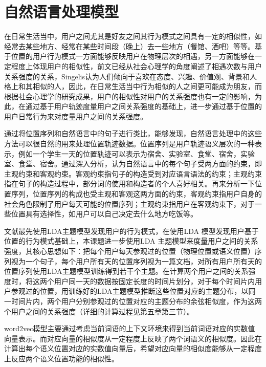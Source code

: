 \section{自然语言处理模型}
\label{sec:section2-3}
在日常生活当中，用户之间尤其是好友之间其行为模式之间具有一定的相似性，如经常去某些地方、经常在某些时间段（晚上）去一些地方（餐馆、酒吧）等等。基于位置的用户行为模式一方面能够反映用户在物理层次的相遇，另一方面能够在一定程度上体现用户的相似性，前文已经从社会心理学的角度阐述了相遇次数与用户关系强度的关系，Singelis认为人们倾向于喜欢在态度、兴趣、价值观、背景和人格上和其相似的人，因此，在日常生活当中行为相似的人之间更可能成为朋友，而根据社会心理学的研究成果，用户的相似性对用户的关系强度也有一定的影响，为此，在通过基于用户轨迹度量用户之间关系强度的基础上，进一步通过基于位置的用户日常行为来对度量用户之间的关系强度。
\par 通过将位置序列和自然语言中的句子进行类比，能够发现，自然语言处理中的这些方法可以很自然的用来处理位置轨迹数据。位置序列是用户轨迹语义层次的一种表示，例如一个学生一天的位置轨迹可以表示为宿舍、实验室、食堂、宿舍，实验室、食堂、宿舍。通过深入分析，认为自然语言中的每个句子受两方面的约束，即主观约束和客观约束。客观约束指句子的构造受到对应语言语法的约束；主观约束指在句子的构造过程中，部分词的使用和构造者的个人喜好相关。再来分析一下位置序列，位置序列的构成也受主观和客观这两方面的约束，客观约束指用户自身的社会角色限制了用户每天可能的位置序列；主观约束指用户在客观约束下，对于一些位置具有选择性，如用户可以自己决定去什么地方吃饭等。
\par 文献\cite{farrahi2008did}最先使用LDA主题模型发现用户的行为模式，在使用LDA 模型发现用户基于位置的行为模式基础上，本课题进一步使用LDA 主题模型来度量用户之间的关系强度，其核心思想如下：把每个用户每天参观过的位置（物理位置或语义位置）序列视为一个句子，每个用户所有天的位置序列视为一篇文档，对所有用户所有天的位置序列使用LDA主题模型训练得到若干个主题。在计算两个用户之间的关系强度时，将这两个用户同一天的数据按固定长度的时间片划分，对于每个时间片内用户参观过的位置，用训练好的LDA主题模型推断这些位置对应的主题分布，以同一时间片内，两个用户分别参观过的位置对应的主题分布的余弦相似度，作为这两个用户之间的关系强度（详细的计算过程见第五章第三节）。
\par word2vec模型主要通过考虑当前词语的上下文环境来得到当前词语对应的实数值向量表示。而对应向量的相似度从一定程度上反映了两个词语义的相似度。因此在计算出每个语义位置对应的实数值向量后，希望对应向量的相似度能够从一定程度上反应两个语义位置功能的相似性。
